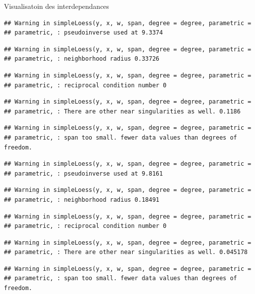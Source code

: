 \documentclass[11pt,ignorenonframetext,]{beamer}
\begin{document}
\begin{frame}[fragile]{Visualisatoin des interdependances}
\begin{verbatim}
## Warning in simpleLoess(y, x, w, span, degree = degree, parametric =
## parametric, : pseudoinverse used at 9.3374
\end{verbatim}

\begin{verbatim}
## Warning in simpleLoess(y, x, w, span, degree = degree, parametric =
## parametric, : neighborhood radius 0.33726
\end{verbatim}

\begin{verbatim}
## Warning in simpleLoess(y, x, w, span, degree = degree, parametric =
## parametric, : reciprocal condition number 0
\end{verbatim}

\begin{verbatim}
## Warning in simpleLoess(y, x, w, span, degree = degree, parametric =
## parametric, : There are other near singularities as well. 0.1186
\end{verbatim}

\begin{verbatim}
## Warning in simpleLoess(y, x, w, span, degree = degree, parametric =
## parametric, : span too small. fewer data values than degrees of freedom.
\end{verbatim}

\begin{verbatim}
## Warning in simpleLoess(y, x, w, span, degree = degree, parametric =
## parametric, : pseudoinverse used at 9.8161
\end{verbatim}

\begin{verbatim}
## Warning in simpleLoess(y, x, w, span, degree = degree, parametric =
## parametric, : neighborhood radius 0.18491
\end{verbatim}

\begin{verbatim}
## Warning in simpleLoess(y, x, w, span, degree = degree, parametric =
## parametric, : reciprocal condition number 0
\end{verbatim}

\begin{verbatim}
## Warning in simpleLoess(y, x, w, span, degree = degree, parametric =
## parametric, : There are other near singularities as well. 0.045178
\end{verbatim}

\begin{verbatim}
## Warning in simpleLoess(y, x, w, span, degree = degree, parametric =
## parametric, : span too small. fewer data values than degrees of freedom.
\end{verbatim}


\end{frame}
\end{document}
